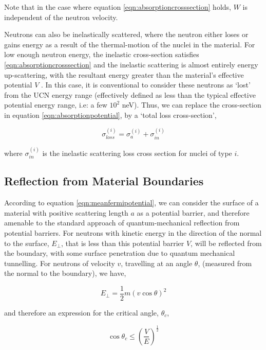 \documentclass[11pt,a4paper,oneside]{article}
\begin{document}
Note that in the case where equation \ref{eqn:absorptioncrosssection} holds, $W$ is independent of the neutron velocity. 

Neutrons can also be inelastically scattered, where the neutron either loses or gains energy as a result of the thermal-motion of the nuclei in the material. For low enough neutron energy, the inelastic cross-section satisfies \ref{eqn:absorptioncrosssection} and the inelastic scattering is almost entirely energy up-scattering, with the resultant energy greater than the material's effective potential $V$ \cite{Go.Ri.La.91}. In this case, it is conventional to consider these neutrons as `lost' from the UCN energy range (effectively defined as less than the typical effective potential energy range, i.e: a few $10^2$ neV). Thus, we can replace the cross-section in equation \ref{eqn:absorptionpotential}, by a `total loss cross-section', 

\begin{equation}
\sigma_{loss}^{(i)} = \sigma_{a}^{(i)} + \sigma_{in}^{(i)}
\label{eqn:totallosscrosssection}
\end{equation}

where $\sigma_{in}^{(i)}$ is the inelastic scattering loss cross section for nuclei of type $i$.

\subsection*{Reflection from Material Boundaries}

According to equation \ref{eqn:meanfermipotential}, we can consider the surface of a material with positive scattering length $a$ as a potential barrier, and therefore amenable to the standard approach of quantum-mechanical reflection from potential barriers. For neutrons with kinetic energy in the direction of the normal to the surface, $E_{\bot}$, that is less than this potential barrier $V$, will be reflected from the boundary, with some surface penetration due to quantum mechanical tunnelling. For neutrons of velocity $v$, travelling at an angle $\theta$, (measured from the normal to the boundary), we have,

\begin{equation}
E_{\bot} = \frac{1}{2}m(v\cos\theta)^{2}
\label{eqn:perpenergy}
\end{equation}

and therefore an expression for the critical angle, $\theta_{c}$,

\begin{equation}
\cos \theta_{c} \leq \left( \frac{V}{E} \right) ^{\frac{1}{2}}
\label{eqn:criticalangle}
\end{equation}
\end{document}
